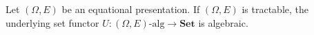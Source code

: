 Let $(\Omega, E)$ be an equational presentation. If $(\Omega, E)$ is tractable, the underlying set functor $U: (\Omega, E)\text{-alg} \rightarrow \mathbf{Set}$ is algebraic.

